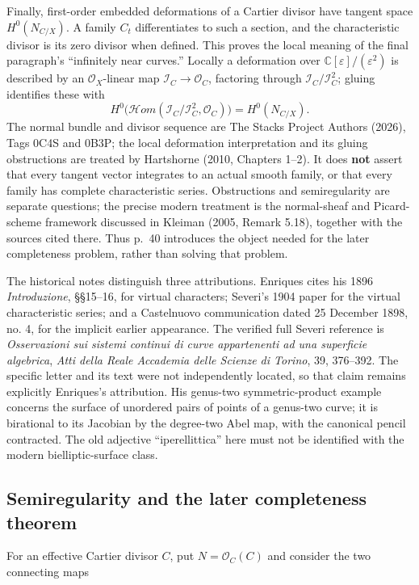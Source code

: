 Finally, first-order embedded deformations of a Cartier divisor have tangent space \(H^0(N_{C/X})\). A family \(C_t\) differentiates to such a section, and the characteristic divisor is its zero divisor when defined. This proves the local meaning of the final paragraph's ``infinitely near curves.'' Locally a deformation over \(\mathbb C[\varepsilon]/(\varepsilon^2)\) is described by an \(\mathcal O_X\)-linear map \(\mathcal I_C\to\mathcal O_C\), factoring through \(\mathcal I_C/\mathcal I_C^2\); gluing identifies these with \[
H^0\bigl(\mathcal{H}om(\mathcal I_C/\mathcal I_C^2,\mathcal O_C)\bigr)
=H^0(N_{C/X}).
\] The normal bundle and divisor sequence are The Stacks Project Authors (2026), Tags 0C4S and 0B3P; the local deformation interpretation and its gluing obstructions are treated by Hartshorne (2010, Chapters 1--2). It does \textbf{not} assert that every tangent vector integrates to an actual smooth family, or that every family has complete characteristic series. Obstructions and semiregularity are separate questions; the precise modern treatment is the normal-sheaf and Picard-scheme framework discussed in Kleiman (2005, Remark 5.18), together with the sources cited there. Thus p.~40 introduces the object needed for the later completeness problem, rather than solving that problem.

The historical notes distinguish three attributions. Enriques cites his 1896 \emph{Introduzione}, §§15--16, for virtual characters; Severi's 1904 paper for the virtual characteristic series; and a Castelnuovo communication dated 25 December 1898, no. 4, for the implicit earlier appearance. The verified full Severi reference is \emph{Osservazioni sui sistemi continui di curve appartenenti ad una superficie algebrica}, \emph{Atti della Reale Accademia delle Scienze di Torino}, 39, 376--392. The specific letter and its text were not independently located, so that claim remains explicitly Enriques's attribution. His genus-two symmetric-product example concerns the surface of unordered pairs of points of a genus-two curve; it is birational to its Jacobian by the degree-two Abel map, with the canonical pencil contracted. The old adjective ``iperellittica'' here must not be identified with the modern bielliptic-surface class.

\subsection{Semiregularity and the later completeness theorem}

For an effective Cartier divisor \(C\), put \(N=\mathcal O_C(C)\) and consider the two connecting maps

